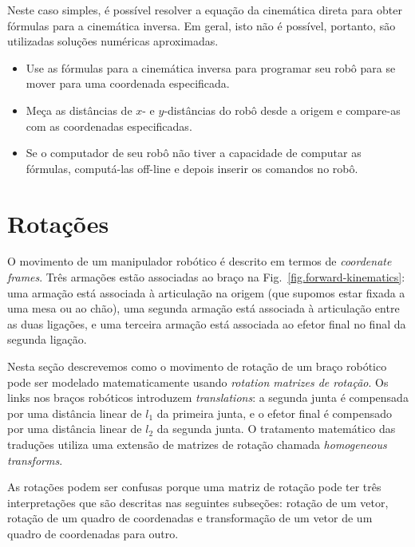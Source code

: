 Neste caso simples, é possível resolver a equação da cinemática direta para obter fórmulas para a cinemática inversa. Em geral, isto não é possível, portanto, são utilizadas soluções numéricas aproximadas.

\begin{framed}
\begin{itemize}
\item Use as fórmulas para a cinemática inversa para programar seu robô para se mover para uma coordenada especificada.
\item Meça as distâncias de $x$- e $y$-distâncias do robô desde a origem e compare-as com as coordenadas especificadas.
\item Se o computador de seu robô não tiver a capacidade de computar as fórmulas, computá-las off-line e depois inserir os comandos no robô.
\end{itemize}
\end{framed}


\section{Rotações}\label{s.rotations}

O movimento de um manipulador robótico é descrito em termos de \emph{coordenate frames}. Três armações estão associadas ao braço na Fig.~\ref{fig.forward-kinematics}: uma armação está associada à articulação na origem (que supomos estar fixada a uma mesa ou ao chão), uma segunda armação está associada à articulação entre as duas ligações, e uma terceira armação está associada ao efetor final no final da segunda ligação.

Nesta seção descrevemos como o movimento de rotação de um braço robótico pode ser modelado matematicamente usando \emph{rotation matrizes de rotação}. Os links nos braços robóticos introduzem \emph{translations}: a segunda junta é compensada por uma distância linear de $l_1$ da primeira junta, e o efetor final é compensado por uma distância linear de $l_2$ da segunda junta. O tratamento matemático das traduções utiliza uma extensão de matrizes de rotação chamada \emph{homogeneous transforms}.

As rotações podem ser confusas porque uma matriz de rotação pode ter três interpretações que são descritas nas seguintes subseções: rotação de um vetor, rotação de um quadro de coordenadas e transformação de um vetor de um quadro de coordenadas para outro.

